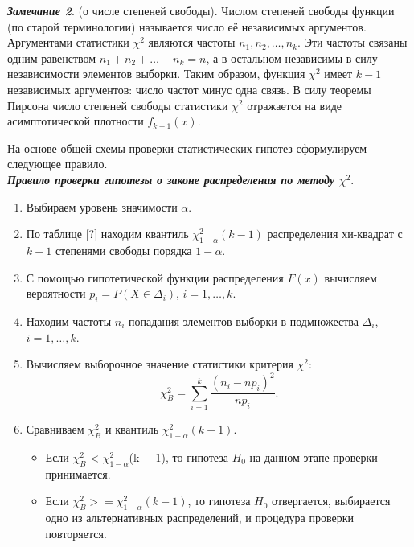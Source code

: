 \documentclass[main.tex]{subfiles}
\begin{document}
\textbf{\textit{Замечание 2}}. (о числе степеней свободы).
Числом степеней свободы функции (по старой терминологии) называется число её независимых аргументов. Аргументами статистики $\chi^{2}$ являются частоты $n_{1},n_{2}, \dots,n_{k}$. Эти частоты связаны одним равенством $n_{1} + n_{2} + \dots + n_{k}  = n$, а в остальном независимы в силу независимости элементов выборки. Таким образом, функция $\chi^{2}$  имеет $k-1$ независимых аргументов: число частот минус одна связь. В силу теоремы Пирсона число степеней свободы статистики $\chi^{2}$  отражается на виде асимптотической плотности $f_{k - 1}(x)$.

На основе общей схемы проверки статистических гипотез сформулируем следующее правило. \\

\textbf{\textit{Правило проверки гипотезы о законе распределения по методу $\chi^{2}$}}.

\begin{enumerate}
	\item Выбираем уровень значимости $\alpha$.
	
	\item По таблице [?] находим квантиль $\chi^{2}_{1-\alpha}(k - 1)$ распределения хи-квадрат с $k-1$ степенями свободы порядка $1-\alpha$. 
	
	\item С помощью гипотетической функции распределения $F(x)$ вычисляем вероятности $p_{i} = P (X \in \Delta_{i})$, $i = 1, \dots, k$.
	
	\item Находим частоты $n_{i}$ попадания элементов выборки в подмножества $\Delta_{i}$, $i = 1, \dots, k$.
	
	\item Вычисляем выборочное значение статистики критерия $\chi^{2}$:
	\begin{equation}
		\chi^{2}_{B} =\sum_{i = 1}^{k}{\frac{(n_{i} - np_{i})^{2}}{np_{i}}}.
		\label{eq:chi_B}
	\end{equation}

	\item Сравниваем $\chi^{2}_{B}$ и квантиль $\chi^{2}_{1-\alpha}(k-1)$.
	\begin{itemize}
		\item Если $\chi^{2}_{B}$ < $\chi^{2}_{1-\alpha}$(k $-$ 1), то гипотеза $H_{0}$ на данном этапе проверки принимается.
		
		\item Если $\chi^{2}_{B} >= \chi^{2}_{1-\alpha}(k -1)$, то гипотеза $H_{0}$ отвергается, выбирается одно из альтернативных распределений, и процедура проверки повторяется.
	\end{itemize}
\end{enumerate} 
\end{document}
